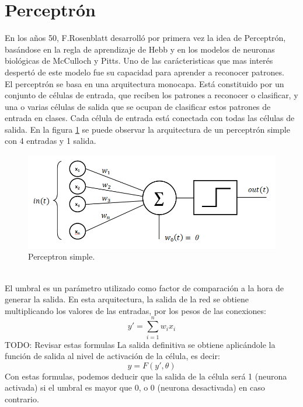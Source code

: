 \section {Perceptrón}
En los años 50, F.Rosenblatt desarrolló por primera vez la idea de Perceptrón, basándose en la regla de aprendizaje de Hebb y en los modelos de neuronas biológicas de McCulloch y Pitts. Uno de las carácteristicas que mas interés despertó de este modelo fue su capacidad para aprender a reconocer patrones.\\
El perceptrón se basa en una arquitectura monocapa. Está constituido por un conjunto de células de entrada, que reciben los patrones a reconocer o clasificar, y una o varias células de salida que se ocupan de clasificar estos patrones de entrada en clases. Cada célula de entrada está conectada con todas las células de salida. En la figura \ref{perceptron} se puede observar la arquitectura de un perceptrón simple con 4 entradas y 1 salida.
\begin{figure}[htp]
\centering
\vspace{-1em}
\includegraphics[scale=0.5]{images/perceptron.png}
\caption{Perceptron simple.}
\label{perceptron}
\end{figure}
\\El umbral es un parámetro utilizado como factor de comparación a la hora de generar la salida. En esta arquitectura, la salida de la red se obtiene multiplicando los valores de las entradas, por los pesos de las conexiones:
\begin{equation}\label{Umbral perceptron}
y' =  \sum_{i=1}^{n} w_{i}x_{i}
\end{equation}
TODO: Revisar estas formulas
La salida definitiva se obtiene aplicándole la función de salida al nivel de activación de la célula, es decir:
\begin{equation}\label{Salida perceptron}
y =  F(y', \theta)
\end{equation}
Con estas formulas, podemos deducir que la salida de la célula será 1 (neurona activada) si el umbral es mayor que 0, o 0 (neurona desactivada) en caso contrario.\\
